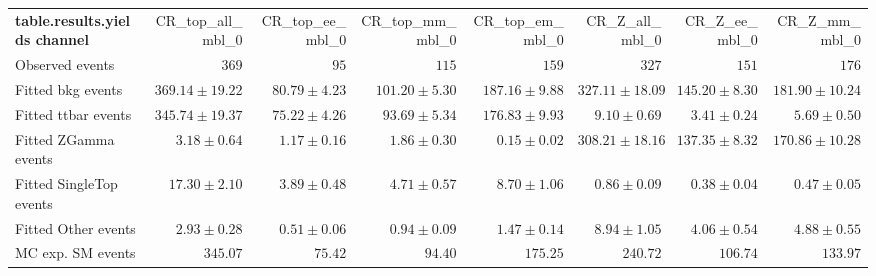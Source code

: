 

\begin{table}
\begin{center}
\setlength{\tabcolsep}{0.0pc}
{\small
\begin{tabular*}{\textwidth}{@{\extracolsep{\fill}}lrrrrrrr}
\noalign{\smallskip}\hline\noalign{\smallskip}
{\bf table.results.yields channel}           & CR\_top\_all\_mbl\_0            & CR\_top\_ee\_mbl\_0            & CR\_top\_mm\_mbl\_0            & CR\_top\_em\_mbl\_0            & CR\_Z\_all\_mbl\_0            & CR\_Z\_ee\_mbl\_0            & CR\_Z\_mm\_mbl\_0              \\[-0.05cm]
\noalign{\smallskip}\hline\noalign{\smallskip}
Observed events          & $369$              & $95$              & $115$              & $159$              & $327$              & $151$              & $176$                    \\
\noalign{\smallskip}\hline\noalign{\smallskip}
Fitted bkg events         & $369.14 \pm 19.22$          & $80.79 \pm 4.23$          & $101.20 \pm 5.30$          & $187.16 \pm 9.88$          & $327.11 \pm 18.09$          & $145.20 \pm 8.30$          & $181.90 \pm 10.24$              \\
\noalign{\smallskip}\hline\noalign{\smallskip}
        Fitted ttbar events         & $345.74 \pm 19.37$          & $75.22 \pm 4.26$          & $93.69 \pm 5.34$          & $176.83 \pm 9.93$          & $9.10 \pm 0.69$          & $3.41 \pm 0.24$          & $5.69 \pm 0.50$              \\
        Fitted ZGamma events         & $3.18 \pm 0.64$          & $1.17 \pm 0.16$          & $1.86 \pm 0.30$          & $0.15 \pm 0.02$          & $308.21 \pm 18.16$          & $137.35 \pm 8.32$          & $170.86 \pm 10.28$              \\
        Fitted SingleTop events         & $17.30 \pm 2.10$          & $3.89 \pm 0.48$          & $4.71 \pm 0.57$          & $8.70 \pm 1.06$          & $0.86 \pm 0.09$          & $0.38 \pm 0.04$          & $0.47 \pm 0.05$              \\
        Fitted Other events         & $2.93 \pm 0.28$          & $0.51 \pm 0.06$          & $0.94 \pm 0.09$          & $1.47 \pm 0.14$          & $8.94 \pm 1.05$          & $4.06 \pm 0.54$          & $4.88 \pm 0.55$              \\
 \noalign{\smallskip}\hline\noalign{\smallskip}
MC exp. SM events              & $345.07$          & $75.42$          & $94.40$          & $175.25$          & $240.72$          & $106.74$          & $133.97$              \\

\end{tabular*}}
\end{center}
\end{table}
